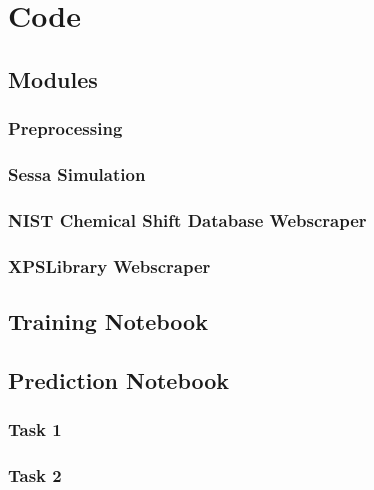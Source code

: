 

\chapter{Code} %

\label{AppendixA} %

\section{Modules}

\subsection{Preprocessing}
\label{preprocessing}


\subsection{Sessa Simulation}
\label{Sessa_Module}


\subsection{NIST Chemical Shift Database Webscraper}
\label{NIST_WebScraper}


\subsection{XPSLibrary Webscraper}
\label{xpslibrary_webscraper}


\section{Training Notebook}

\section{Prediction Notebook}

\subsection{Task 1}

\subsection{Task 2}